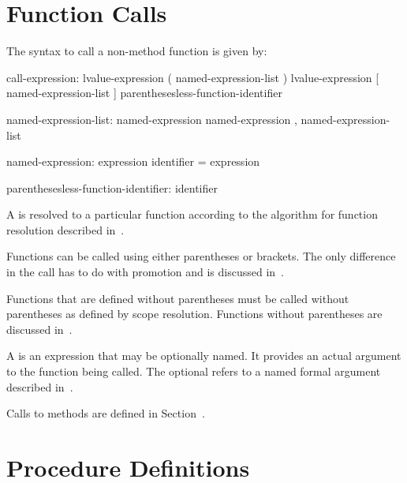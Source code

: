\section{Function Calls}
\label{Function_Calls}

The syntax to call a non-method function is given by:
\begin{syntax}
call-expression:
  lvalue-expression ( named-expression-list )
  lvalue-expression [ named-expression-list ]
  parenthesesless-function-identifier

named-expression-list:
  named-expression
  named-expression , named-expression-list

named-expression:
  expression
  identifier = expression

parenthesesless-function-identifier:
  identifier
\end{syntax}


A  is resolved to a particular function
according to the algorithm for function resolution described
in~.

Functions can be called using either parentheses or brackets.  The
only difference in the call has to do with promotion and is discussed
in~.

Functions that are defined without parentheses must be called without
parentheses as defined by scope resolution.  Functions without
parentheses are discussed in~.

A  is an expression that may be optionally
named.  It provides
an actual argument to the function being called.
The optional  refers to a named formal
argument described in~.

Calls to methods are defined in Section~.


\section{Procedure Definitions}
\label{Function_Definitions}

